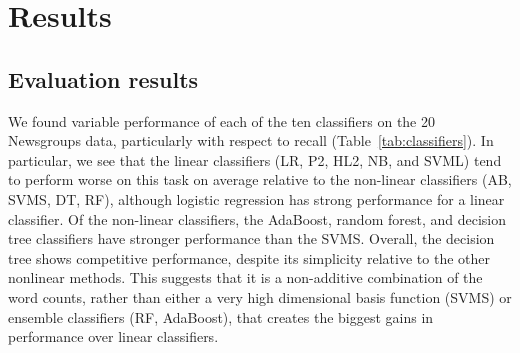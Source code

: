\documentclass{article} %
\begin{document}

\newpage

\section{Results}

\subsection{Evaluation results}

We found variable performance of each of the ten classifiers on the 20 Newsgroups data, particularly with respect to recall (Table~\ref{tab:classifiers}). In particular, we see that the linear classifiers (LR, P2, HL2, NB, and SVML) tend to perform worse on this task on average relative to the non-linear classifiers (AB, SVMS, DT, RF), although logistic regression has strong performance for a linear classifier. Of the non-linear classifiers, the AdaBoost, random forest, and decision tree classifiers have stronger performance than the SVMS. Overall, the decision tree shows competitive performance, despite its simplicity relative to the other nonlinear methods. This suggests that it is a non-additive combination of the word counts, rather than either a very high dimensional basis function (SVMS) or ensemble classifiers (RF, AdaBoost), that creates the biggest gains in performance over linear classifiers.
\end{document}
